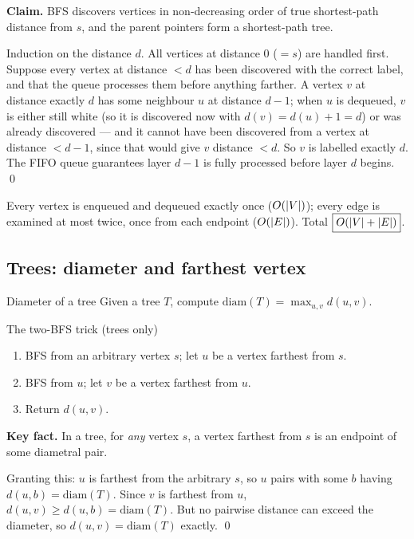 \begin{correct}
\textbf{Claim.} BFS discovers vertices in non-decreasing order of true shortest-path distance
from $s$, and the parent pointers form a shortest-path tree.

\prf Induction on the distance $d$. All vertices at distance $0$ ($=s$) are handled first.
Suppose every vertex at distance $<d$ has been discovered with the correct label, and that the
queue processes them before anything farther. A vertex $v$ at distance exactly $d$ has some
neighbour $u$ at distance $d-1$; when $u$ is dequeued, $v$ is either still white (so it is
discovered now with $d(v)=d(u)+1=d$) or was already discovered --- and it cannot have been
discovered from a vertex at distance $<d-1$, since that would give $v$ distance $<d$. So $v$ is
labelled exactly $d$. The FIFO queue guarantees layer $d-1$ is fully processed before layer $d$
begins. \qed
\end{correct}

\begin{cplx}
Every vertex is enqueued and dequeued exactly once ($O(|V|)$); every edge is examined at most
twice, once from each endpoint ($O(|E|)$). Total $\boxed{O(|V|+|E|)}$.
\end{cplx}

\subsection*{Trees: diameter and farthest vertex}

\begin{prob}{Diameter of a tree}
Given a tree $T$, compute $\mathrm{diam}(T)=\max_{u,v}d(u,v)$.
\end{prob}

\begin{algo}{The two-BFS trick (trees only)}
\begin{enumerate}
  \item BFS from an arbitrary vertex $s$; let $u$ be a vertex farthest from $s$.
  \item BFS from $u$; let $v$ be a vertex farthest from $u$.
  \item Return $d(u,v)$.
\end{enumerate}
\end{algo}

\begin{correct}
\textbf{Key fact.} In a tree, for \emph{any} vertex $s$, a vertex farthest from $s$ is an
endpoint of some diametral pair.

Granting this: $u$ is farthest from the arbitrary $s$, so $u$ pairs with some $b$ having
$d(u,b)=\mathrm{diam}(T)$. Since $v$ is farthest from $u$, $d(u,v)\ge d(u,b)=\mathrm{diam}(T)$.
But no pairwise distance can exceed the diameter, so $d(u,v)=\mathrm{diam}(T)$ exactly. \qed
\end{correct}

